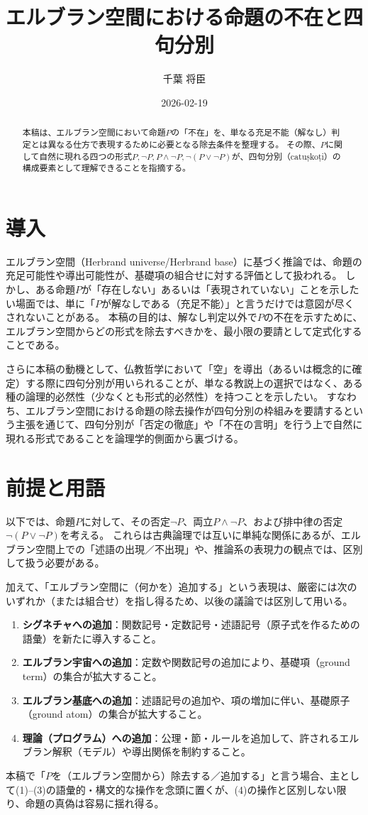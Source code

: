\documentclass[a4paper,11pt]{article}
\title{エルブラン空間における命題の不在と四句分別}
\author{千葉 将臣}
\date{2026-02-19}
\begin{document}
\maketitle

\begin{abstract}
本稿は、エルブラン空間において命題$P$の「不在」を、単なる充足不能（解なし）判定とは異なる仕方で表現するために必要となる除去条件を整理する。
その際、$P$に関して自然に現れる四つの形式$P,\neg P, P\wedge \neg P, \neg(P\vee \neg P)$が、四句分別（catuṣkoṭi）の構成要素として理解できることを指摘する。
\end{abstract}

\section{導入}
エルブラン空間（Herbrand universe/Herbrand base）に基づく推論では、命題の充足可能性や導出可能性が、基礎項の組合せに対する評価として扱われる。
しかし、ある命題$P$が「存在しない」あるいは「表現されていない」ことを示したい場面では、単に「$P$が解なしである（充足不能）」と言うだけでは意図が尽くされないことがある。
本稿の目的は、解なし判定以外で$P$の不在を示すために、エルブラン空間からどの形式を除去すべきかを、最小限の要請として定式化することである。

さらに本稿の動機として、仏教哲学において「空」を導出（あるいは概念的に確定）する際に四句分別が用いられることが、単なる教説上の選択ではなく、ある種の論理的必然性（少なくとも形式的必然性）を持つことを示したい。
すなわち、エルブラン空間における命題の除去操作が四句分別の枠組みを要請するという主張を通じて、四句分別が「否定の徹底」や「不在の言明」を行う上で自然に現れる形式であることを論理学的側面から裏づける。

\section{前提と用語}
以下では、命題$P$に対して、その否定$\neg P$、両立$P\wedge \neg P$、および排中律の否定$\neg(P\vee \neg P)$を考える。
これらは古典論理では互いに単純な関係にあるが、エルブラン空間上での「述語の出現／不出現」や、推論系の表現力の観点では、区別して扱う必要がある。

加えて、「エルブラン空間に（何かを）追加する」という表現は、厳密には次のいずれか（または組合せ）を指し得るため、以後の議論では区別して用いる。
\begin{enumerate}
\item \textbf{シグネチャへの追加}：関数記号・定数記号・述語記号（原子式を作るための語彙）を新たに導入すること。
\item \textbf{エルブラン宇宙への追加}：定数や関数記号の追加により、基礎項（ground term）の集合が拡大すること。
\item \textbf{エルブラン基底への追加}：述語記号の追加や、項の増加に伴い、基礎原子（ground atom）の集合が拡大すること。
\item \textbf{理論（プログラム）への追加}：公理・節・ルールを追加して、許されるエルブラン解釈（モデル）や導出関係を制約すること。
\end{enumerate}
本稿で「$P$を（エルブラン空間から）除去する／追加する」と言う場合、主として(1)--(3)の語彙的・構文的な操作を念頭に置くが、(4)の操作と区別しない限り、命題の真偽は容易に揺れ得る。
\end{document}
